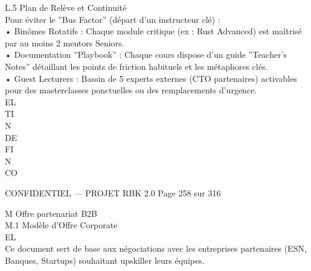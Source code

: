 \documentclass[12pt,landscape,a4paper]{article}
\newenvironment{confidential}
{\begin{tcolorbox}[
    colback=rbkred!5!white,
    colframe=rbkred!75!black,
    title=CONFIDENTIEL,
    fonttitle=\bfseries\color{white},
    coltitle=rbkred!75!black,
    breakable,
    enhanced,
    frame hidden,
    borderline west={2pt}{0pt}{rbkred!75!black}
]}
{\end{tcolorbox}}
\begin{document}
\vspace{0.5em}
L.5 Plan de Relève et Continuité\\
Pour éviter le ”Bus Factor” (départ d’un instructeur clé) :\\
\vspace{0.5em}
• Binômes Rotatifs : Chaque module critique (ex : Rust Advanced) est maîtrisé par au moins 2 mentors Seniors.\\
\vspace{0.5em}
• Documentation ”Playbook” : Chaque cours dispose d’un guide ”Teacher’s Notes” détaillant les points de friction habituels et les métaphores clés.\\
\vspace{0.5em}
• Guest Lecturers : Bassin de 5 experts externes (CTO partenaires) activables pour des masterclasses ponctuelles ou des remplacements d’urgence.\\
\vspace{0.5em}
\vspace{0.5em}
\vspace{0.5em}
\vspace{0.5em}
EL\\
TI\\
N\\
DE\\
FI\\
N\\
CO\\
\vspace{0.5em}
\vspace{0.5em}
\vspace{0.5em}
\vspace{0.5em}
\begin{confidential}CONFIDENTIEL — PROJET RBK 2.0                                          Page 258 sur 316\end{confidential}
M \textbar{} Offre partenariat B2B\\
\vspace{0.5em}
\vspace{0.5em}
M.1 Modèle d’Offre Corporate\\
\vspace{0.5em}
\vspace{0.5em}
\vspace{0.5em}
\vspace{0.5em}
EL\\
Ce document sert de base aux négociations avec les entreprises partenaires (ESN, Banques, Startups) souhaitant upskiller leurs équipes.\\
\vspace{0.5em}
\end{document}
